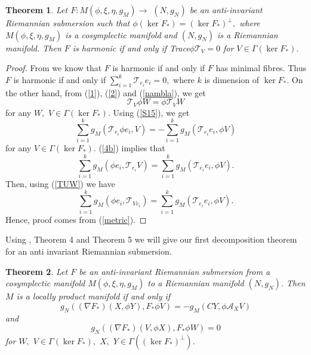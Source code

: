 \documentclass{amsart}
\newtheorem{theorem}{Theorem}
\theoremstyle{plain}
\numberwithin{equation}{section}
\begin{document}
\begin{theorem}
Let $F:M(\phi ,\xi ,\eta ,g_{M})\rightarrow $ $(N,g_{N})$ be an
anti-invariant Riemannian submersion such that $\phi (\ker F_{\ast })=(\ker
F_{\ast })^{\bot },$ where $M(\phi ,\xi ,\eta ,g_{M})$ is a cosymplectic
manifold and $(N,g_{N})$ is a Riemannian manifold. Then $F$ is harmonic if
and only if Trace$\phi \mathcal{T}_{V}=0$ for $V\in \Gamma (\ker F_{\ast }).$
\end{theorem}

\begin{proof}
From \cite{EJ} we know that $F$ is harmonic if and only if $F$ has minimal
fibres. Thus $F$ is harmonic if and only if $\sum\limits_{i=1}^{k}\mathcal{T}_{e_{i}}e_{i}=0,$ where $k$ is dimension of $\ker F_{\ast }$. On the other
hand, from (\ref{1}), (\ref{2}) and (\ref{nambla}), we get\begin{equation}
\mathcal{T}_{V}\phi W=\phi \mathcal{T}_{V}W  \label{S15}
\end{equation}for any $W,$ $V\in \Gamma (\ker F_{\ast }).$ Using (\ref{S15}), we get 
\begin{equation*}
\sum\limits_{i=1}^{k}g_{M}(\mathcal{T}_{e_{i}}\phi
e_{i},V)=-\sum\limits_{i=1}^{k}g_{M}(\mathcal{T}_{e_{i}}e_{i},\phi V)
\end{equation*}for any $V\in \Gamma (\ker F_{\ast }).$ (\ref{4b}) implies that\begin{equation*}
\sum\limits_{i=1}^{k}g_{M}(\phi e_{i},\mathcal{T}_{e_{i}}V)=\sum\limits_{i=1}^{k}g_{M}(\mathcal{T}_{e_{i}}e_{i},\phi V).
\end{equation*}Then, using (\ref{TUW}) we have\begin{equation*}
\sum\limits_{i=1}^{k}g_{M}(\phi e_{i},\mathcal{T}_{Ve_{i}})=\sum\limits_{i=1}^{k}g_{M}(\mathcal{T}_{e_{i}}e_{i},\phi V).
\end{equation*}Hence, proof comes from (\ref{metric}).
\end{proof}

Using \cite{PON}, Theorem 4 and Theorem 5 we will give our first
decomposition theorem for an anti invariant Riemannian submersion.

\begin{theorem}
Let $F$ be an anti-invariant Riemannian submersion from a cosymplectic
manifold $M(\phi ,\xi ,\eta ,g_{M})$ to a Riemannian manifold $(N,g_{N}).$
Then $M$ is a locally product manifold if and only if\begin{equation*}
g_{N}((\nabla F_{\ast })(X,\phi Y),F_{\ast }\phi V)=-g_{M}(CY,\phi \mathcal{A}_{X}V)
\end{equation*}and\begin{equation*}
g_{N}((\nabla F_{\ast })(V,\phi X),F_{\ast }\phi W)=0
\end{equation*}for $W,$ $V\in \Gamma (\ker F_{\ast }),$ $X,$ $Y\in \Gamma ((\ker F_{\ast
})^{\bot }).$
\end{theorem}
\end{document}
